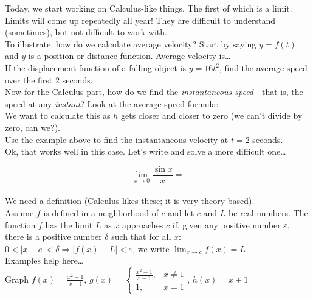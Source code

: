 \documentclass[11pt]{article}
\begin{document}
    \noindent Today, we start working on Calculus-like things. The first of which is a limit. Limits will come up repeatedly all year! They are difficult to understand (sometimes), but not difficult to work with.\\[2ex]

    \noindent To illustrate, how do we calculate average velocity? Start by saying $\displaystyle y = f(t)$ and $\displaystyle y$ is a position or distance function. Average velocity is\dots\\[2ex]

    \noindent If the displacement function of a falling object is $\displaystyle y=16t^2$, find the average speed over the first $\displaystyle 2$ seconds.\\[2ex]

    \noindent Now for the Calculus part, how do we find the \emph{instantaneous speed}---that is, the speed at any \emph{instant}? Look at the average speed formula:\\[2ex]

    \noindent We want to calculate this as $\displaystyle h$ gets closer and closer to zero (we can't divide by zero, can we?).\\[2ex]

    \noindent Use the example above to find the instantaneous velocity at $\displaystyle t = 2$ seconds.\\[2ex]

    \noindent Ok, that works well in this case. Let's write and solve a more difficult one\dots

    \[\lim_{x\to0} \frac{\sin x}{x} =\]\\[2ex]

    \noindent We need a definition (Calculus likes these; it is very theory-based).\\
    Assume $\displaystyle f$ is defined in a neighborhood of $\displaystyle c$ and let $\displaystyle c$ and $\displaystyle L$ be real numbers. The function $\displaystyle f$ has the limit $\displaystyle L$ as $\displaystyle x$ approaches $\displaystyle c$ if, given any positive number $\displaystyle \varepsilon$, there is a positive number $\displaystyle \delta$ such that for all $\displaystyle x$:\\[1ex]

    \noindent $\displaystyle 0 < |x - c| < \delta \Rightarrow |f(x) - L| < \varepsilon$, we write $\displaystyle \lim_{x\to c} f(x) = L$\\[2ex]

    \noindent Examples help here\dots\\
    Graph $\displaystyle f(x) = \frac{x^2 - 1}{x - 1}$,
    $g(x) = \begin{cases}
        \frac{x^2 - 1}{x - 1}, & x \neq 1 \\[1ex]
        1,                     & x = 1
    \end{cases}$, $\displaystyle h(x) = x + 1$
\end{document}
